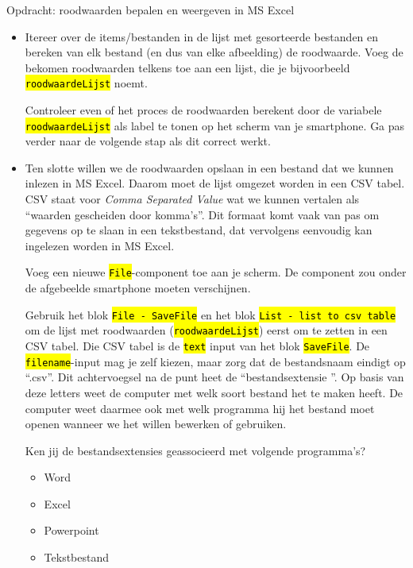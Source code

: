\begin{opdracht}{Opdracht: roodwaarden bepalen en weergeven in MS Excel}
\begin{enumerate}
\begin{itemize}
			\item Itereer over de items/bestanden in de lijst met gesorteerde bestanden en bereken van elk bestand (en dus van elke afbeelding) de roodwaarde. Voeg de bekomen roodwaarden telkens toe aan een lijst, die je bijvoorbeeld \hl{\texttt{roodwaardeLijst}} noemt.
			
			Controleer even of het proces de roodwaarden berekent door de variabele \hl{\texttt{roodwaardeLijst}} als label te tonen op het scherm van je smartphone. Ga pas verder naar de volgende stap als dit correct werkt.
			
			\item Ten slotte willen we de roodwaarden opslaan in een bestand dat we kunnen inlezen in MS Excel. Daarom moet de lijst omgezet worden in een CSV tabel. CSV staat voor \emph{Comma Separated Value} wat we kunnen vertalen als \textquotedblleft waarden gescheiden door komma's\textquotedblright. Dit formaat komt vaak van pas om gegevens op te slaan in een tekstbestand, dat vervolgens eenvoudig kan ingelezen worden in MS Excel.
			
			Voeg een nieuwe \hl{\texttt{File}}-component toe aan je scherm. De component zou onder de afgebeelde smartphone moeten verschijnen. 
			
			Gebruik het blok \hl{\texttt{File - SaveFile}} en het blok \hl{\texttt{List - list to csv table}} om de lijst met roodwaarden (\hl{\texttt{roodwaardeLijst}}) eerst om te zetten in een CSV tabel. Die CSV tabel is de \hl{\texttt{text}} input van het blok \hl{\texttt{SaveFile}}. De \hl{\texttt{filename}}-input mag je zelf kiezen, maar zorg dat de bestandsnaam eindigt op \textquotedblleft .csv\textquotedblright. Dit achtervoegsel na de punt heet de \textquotedblleft bestandsextensie \textquotedblright. Op basis van deze letters weet de computer met welk soort bestand het te maken heeft. De computer weet daarmee ook met welk programma hij het bestand moet openen wanneer we het willen bewerken of gebruiken.
			
			\begin{oef}
			Ken jij de bestandsextensies geassocieerd met volgende programma's?
						
			\begin{itemize}
			\item Word
			\item Excel
			\item Powerpoint
			\item Tekstbestand
			\end{itemize}
			\end{oef}
			

\end{itemize}
\end{enumerate}
\end{opdracht}
